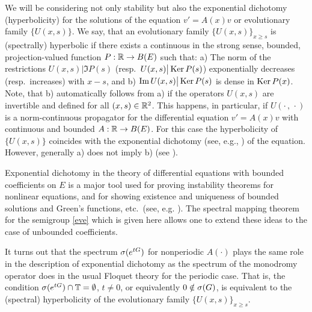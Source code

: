 We will be considering not only stability but also the exponential
dichotomy (hyperbolicity) for the solutions of the equation $v'=A(x) v$ or
evolutionary family $\{U(x,s)\}$.  We say, that
an evolutionary family $\{U(x,s)\}_{x\geq s}$ is
(spectrally) hyperbolic if there exists a continuous in the strong sense,
bounded, projection-valued function $P:{\Bbb{R}} \to B(E)$ such that: a) The
norm of the restrictions $U(x,s) \big| \Im P(s)$ (resp.\ $U(x,s) \big|
\operatorname{Ker} P(s)$) exponentially decreases (resp.\ increases) with $x-s$, and b)
$\operatorname{Im} U(x,s) \big| \operatorname{Ker} P(s)$ is dense in $\operatorname{Ker} P(x)$. Note, that b)
automatically follows from a) if the operators $U(x,s)$ are invertible
and defined for all $(x,s) \in{\Bbb{R}}^2$.
This happens, in particular, if $U(\cdot\, , \, \cdot)$ is a
norm-continuous propagator for the differential
equation $v'=A(x)v$ with continuous and bounded
$A:{\Bbb{R}}\to B(E)$. For this case the hyperbolicity of
$\{U(x,s)\}$ coincides with the exponential dichotomy (see, e.g.,
\cite{9}) of the equation.
However, generally a) does not imply b) (see \cite{27}).

Exponential dichotomy in the theory of differential equations with bounded
coefficients on $E$ is a major tool used for proving instability theorems for
nonlinear equations, and for showing
existence and uniqueness of bounded solutions and
Green's functions, etc.\ (see, e.g. \cite{7,9}).  The spectral
mapping theorem for the semigroup \eqref{eve} which is given here allows
one to extend these ideas to the case of unbounded coefficients.

It turns out that the spectrum $\sigma (e^{tG})$ for nonperiodic $A(\cdot)$
plays the same role in the description of exponential dichotomy as the
spectrum of the monodromy operator does in the usual Floquet theory for
the periodic
case.  That is, the condition $\sigma (e^{tG}) \cap {\Bbb{T}} =\emptyset$,
$t\neq 0$, or equivalently $0\notin \sigma (G)$, is
equivalent to the (spectral) hyperbolicity of the evolutionary family
$\{U(x,s)\}_{x\geq s}$.

